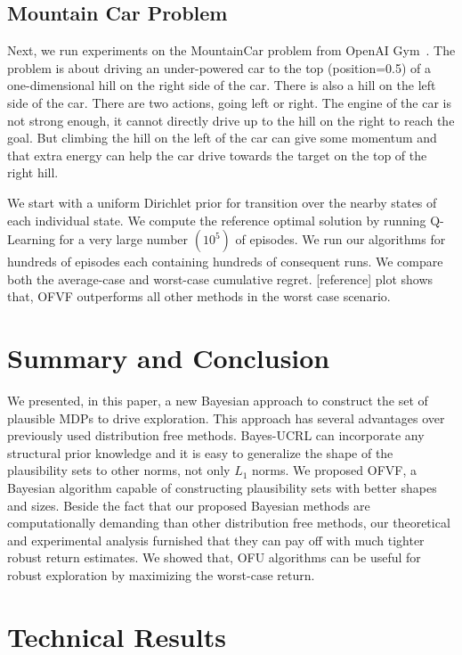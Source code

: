 \documentclass{article}
\theoremstyle{plain}
\theoremstyle{definition}
\begin{document}
\subsection{Mountain Car Problem}
Next, we run experiments on the MountainCar problem from OpenAI Gym~\citep{openai}. The problem is about driving an under-powered car to the top (position=0.5) of a one-dimensional hill on the right side of the car. There is also a hill on the left side of the car. There are two actions, going left or right. The engine of the car is not strong enough, it cannot directly drive up to the hill on the right to reach the goal. But climbing the hill on the left of the car can give some momentum and that extra energy can help the car drive towards the target on the top of the right hill.

We start with a uniform Dirichlet prior for transition over the nearby states of each individual state. We compute the reference optimal solution by running Q-Learning for a very large number $(10^5)$ of episodes. We run our algorithms for hundreds of episodes each containing hundreds of consequent runs. We compare both the average-case and worst-case cumulative regret. [reference] plot shows that, OFVF outperforms all other methods in the worst case scenario.

\section{Summary and Conclusion} \label{sec:conclusion}
We presented, in this paper, a new Bayesian approach to construct the set of plausible MDPs to drive exploration. This approach has several advantages over previously used distribution free methods. Bayes-UCRL can incorporate any structural prior knowledge and it is easy to generalize the shape of the plausibility sets to other norms, not only $L_1$ norms. We proposed OFVF, a Bayesian algorithm capable of constructing plausibility sets with better shapes and sizes. Beside the fact that our proposed Bayesian methods are computationally demanding than other distribution free methods, our theoretical and experimental analysis furnished that they can pay off with much tighter robust return estimates. We showed that, OFU algorithms can be useful for robust exploration by maximizing the worst-case return.



\newpage
\appendix
\onecolumn

\section{Technical Results} \label{app:proofs}
\end{document}

